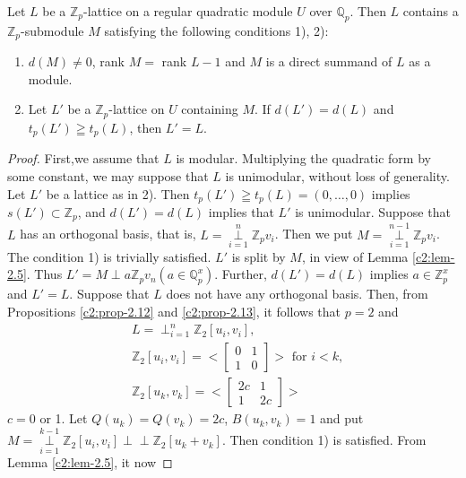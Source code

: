 \begin{lemma}\label{c2:lem-2.41}
Let $L$ be a $\mathbb{Z}_p$-lattice on a regular quadratic module $U$
over $\mathbb{Q}_p$. Then $L$ contains a $\mathbb{Z}_p$-submodule $M$
satisfying the following conditions 1), 2):
\begin{enumerate}
\renewcommand{\labelenumi}{\theenumi)}
\item $d(M) \neq 0$, rank $M=$ rank $L-1$ and $M$ is a direct summand
of $L$ as a module.

\item Let $L'$ be a $\mathbb{Z}_p$-lattice on $U$ containing $M$. If
$d(L')=d(L)$ and $t_p(L')\geqq t_p(L)$, then $L'=L$. 
\end{enumerate}
\end{lemma}

\begin{proof}
First,\pageoriginale we assume that $L$ is modular. Multiplying the
quadratic form by some constant, we may suppose that $L$ is
unimodular, without loss of generality. Let $L'$ be a lattice as in
2). Then $t_p(L') \geqq t_p(L) = (0,\ldots, 0)$ implies $s(L') \subset
\mathbb{Z}_p$, and $d(L')=d(L)$ implies that $L'$ is
unimodular. Suppose that $L$ has an orthogonal basis, that is,
$L=\mathop{\perp}\limits^n_{i=1} \mathbb{Z}_pv_i$. Then we put $M
= \mathop{\perp}\limits^{n-1}_{i=1} \mathbb{Z}_p v_i$. The condition
1) is trivially satisfied. $L'$ is split by $M$, in view of Lemma
\ref{c2:lem-2.5}. Thus $L'=M\perp a \mathbb{Z}_p v_n
(a\in \mathbb{Q}^x_p)$. Further, $d(L') = d(L)$ implies
$a\in \mathbb{Z}^x_p$ and $L'=L$. Suppose that $L$ does not
have any orthogonal basis. Then, from Propositions \ref{c2:prop-2.12} and
\ref{c2:prop-2.13}, it 
follows that $p=2$ and 
\begin{align*}
&L = \mathop{\perp}^n_{i=1} \mathbb{Z}_2 [u_i, v_i],\\  
&\mathbb{Z}_2 [u_i,v_i] = <\begin{bmatrix}
0&1\\1&0\end{bmatrix}> \text{ for } i<k,\\ 
&\mathbb{Z}_2[u_k, v_k] = <\begin{bmatrix}
2c & 1\\
1 & 2c
\end{bmatrix}>
\end{align*}
$c=0$ or 1. Let $Q(u_k)=Q(v_k)=2c$, $B(u_k, v_k)=1$ and put
$M=\mathop{\perp}\limits^{k-1}_{i=1} \mathbb{Z}_2[u_i,v_i]\perp \perp \mathbb{Z}_2
[u_k+v_k]$. Then condition 1) is satisfied. From Lemma \ref{c2:lem-2.5}, it now

\end{proof}
